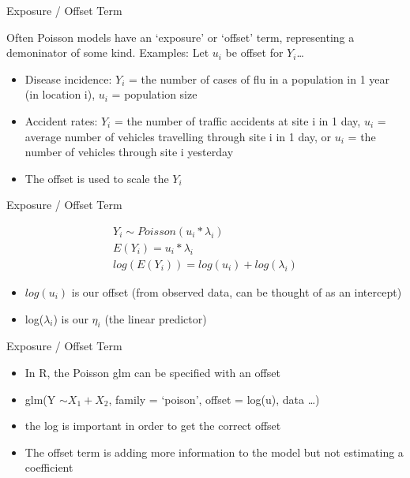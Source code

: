 \documentclass[ignorenonframetext,]{beamer}
\providecommand{\tightlist}{%
  \setlength{\itemsep}{0pt}\setlength{\parskip}{0pt}}
\begin{document}
\begin{frame}{Exposure / Offset Term}

Often Poisson models have an `exposure' or `offset' term, representing a
demoninator of some kind. Examples: Let \(u_i\) be offset for
\(Y_i\)\ldots{}

\begin{itemize}
\item
  Disease incidence: \(Y_i\) = the number of cases of flu in a
  population in 1 year (in location i), \(u_i\) = population size
\item
  Accident rates: \(Y_i\) = the number of traffic accidents at site i in
  1 day, \(u_i\) = average number of vehicles travelling through site i
  in 1 day, or \(u_i\) = the number of vehicles through site i yesterday
\item
  The offset is used to scale the \(Y_i\)
\end{itemize}

\end{frame}

\begin{frame}{Exposure / Offset Term}

\[
\begin{aligned}
Y_i \sim Poisson(u_i * \lambda_i) \\
E(Y_i) = u_i *  \lambda_i \\
log(E(Y_i)) = log(u_i) + log(\lambda_i)
\end{aligned}
\]

\begin{itemize}
\tightlist
\item
  \(log(u_i)\) is our offset (from observed data, can be thought of as
  an intercept)
\item
  log(\(\lambda_i\)) is our \(\eta_i\) (the linear predictor)
\end{itemize}

\end{frame}

\begin{frame}{Exposure / Offset Term}

\begin{itemize}
\tightlist
\item
  In R, the Poisson glm can be specified with an offset
\item
  glm(Y \(\sim X_1 + X_2\), family = `poison', offset = log(u), data
  \ldots{})
\item
  the log is important in order to get the correct offset
\item
  The offset term is adding more information to the model but not
  estimating a coefficient
\end{itemize}

\end{frame}
\end{document}
